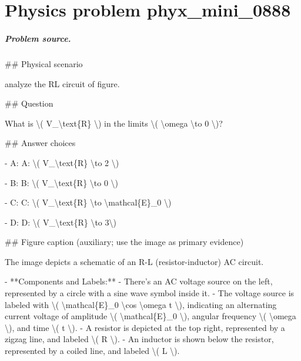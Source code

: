 
\chapter{Physics problem phyx\_mini\_0888}
\label{ch:PhyXMiniProblems_problem_phyx_mini_0888}

\paragraph{Problem source.}
\#\# Physical scenario

analyze the RL circuit of figure.

\#\# Question

What is \textbackslash{}( V\_\textbackslash{}text\{R\} \textbackslash{}) in the limits \textbackslash{}( \textbackslash{}omega \textbackslash{}to 0 \textbackslash{})?

\#\# Answer choices

- A: A: \textbackslash{}( V\_\textbackslash{}text\{R\} \textbackslash{}to 2 \textbackslash{})

- B: B: \textbackslash{}( V\_\textbackslash{}text\{R\} \textbackslash{}to 0 \textbackslash{})

- C: C: \textbackslash{}( V\_\textbackslash{}text\{R\} \textbackslash{}to \textbackslash{}mathcal\{E\}\_0 \textbackslash{})

- D: D: \textbackslash{}( V\_\textbackslash{}text\{R\} \textbackslash{}to 3\textbackslash{})

\#\# Figure caption (auxiliary; use the image as primary evidence)

The image depicts a schematic of an R-L (resistor-inductor) AC circuit. 

- **Components and Labels:**
  - There's an AC voltage source on the left, represented by a circle with a sine wave symbol inside it.
  - The voltage source is labeled with \textbackslash{}( \textbackslash{}mathcal\{E\}\_0 \textbackslash{}cos \textbackslash{}omega t \textbackslash{}), indicating an alternating current voltage of amplitude \textbackslash{}( \textbackslash{}mathcal\{E\}\_0 \textbackslash{}), angular frequency \textbackslash{}( \textbackslash{}omega \textbackslash{}), and time \textbackslash{}( t \textbackslash{}).
  - A resistor is depicted at the top right, represented by a zigzag line, and labeled \textbackslash{}( R \textbackslash{}).
  - An inductor is shown below the resistor, represented by a coiled line, and labeled \textbackslash{}( L \textbackslash{}).

